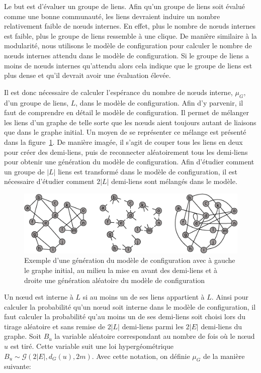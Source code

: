 Le but est d'évaluer un groupe de liens.
Afin qu'un groupe de liens soit évalué comme une bonne communauté, les liens devraient induire un nombre relativement faible de n\oe{}uds internes.
En effet, plus le nombre de n\oe{}uds internes est faible, plus le groupe de liens ressemble à une clique.
De manière similaire à la modularité, nous utilisons le modèle de configuration pour calculer le nombre de n\oe{}uds internes attendu dans le modèle de configuration.
Si le groupe de liens a moins de n\oe{}uds internes qu'attendu alors cela indique que le groupe de liens est plus dense et qu'il devrait avoir une évaluation élevée.


Il est donc nécessaire de calculer l'espérance du nombre de n\oe{}uds interne, $\mu_{G}$, d'un groupe de liens, $L$, dans le modèle de configuration.
Afin d'y parvenir, il faut de comprendre en détail le modèle de configuration.
Il permet de mélanger les liens d'un graphe de telle sorte que les n\oe{}uds aient toujours autant de liaisons que dans le graphe initial.
Un moyen de se représenter ce mélange est présenté dans la figure~\ref{fig:exemple_modele_configuration}.
De manière imagée, il s'agit de couper tous les liens en deux pour créer des demi-liens, puis de reconnecter aléatoirement tous les demi-liens pour obtenir une génération du modèle de configuration.
Afin d'étudier comment un groupe de $|L|$ liens est transformé dans le modèle de configuration, il est nécessaire d'étudier comment $2|L|$ demi-liens sont mélangés dans le modèle.

\begin{figure}
\centering
\includegraphics[width=0.8\linewidth]{img/ExpectedNodes/Example/modele_configuration.eps}
\caption{Exemple d'une génération du modèle de configuration avec à gauche le graphe initial, au milieu la mise en avant des demi-liens et à droite une génération aléatoire du modèle de configuration}
\label{fig:exemple_modele_configuration}
\end{figure}


Un n\oe{}ud est interne à $L$ si au moins un de ses liens appartient à $L$.
Ainsi pour calculer la probabilité qu'un n\oe{}ud soit interne dans le modèle de configuration, il faut calculer la probabilité qu'au moins un de ses demi-liens soit choisi lors du tirage aléatoire et sans remise de $2|L|$ demi-liens parmi les $2|E|$ demi-liens du graphe.
Soit $B_u$ la variable aléatoire correspondant au nombre de fois où le n\oe{}ud $u$ est tiré.
Cette variable suit une loi hypergéométrique $B_u \sim \mathcal{G}\left(2|E|,d_G(u),2m\right)$.
Avec cette notation, on définie $\mu_G$ de la manière suivante:

